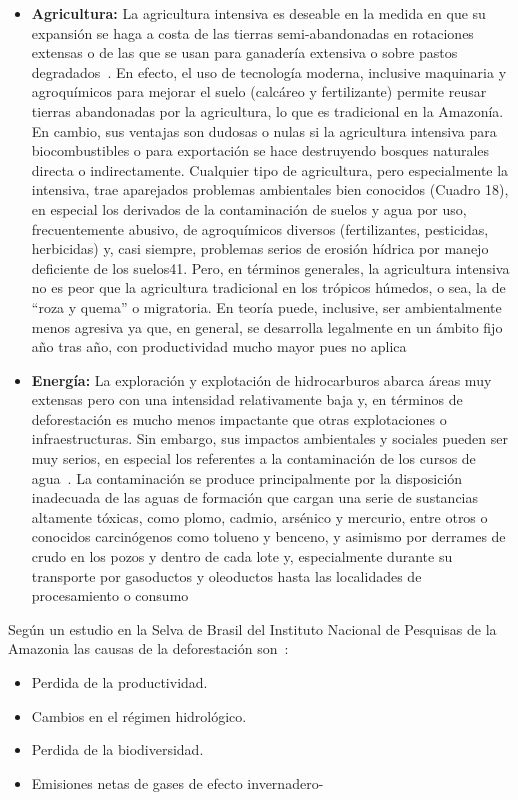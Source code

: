 \begin{itemize}
\item \textbf{Agricultura: }La agricultura intensiva es deseable en la medida en que su expansión se haga a costa de las tierras semi-abandonadas en rotaciones extensas o de las que se usan para ganadería extensiva o sobre pastos degradados~\cite{dourojeanni2009amazonia}. En efecto, el uso de tecnología moderna, inclusive maquinaria y agroquímicos para mejorar el suelo (calcáreo y fertilizante) permite reusar tierras abandonadas por la agricultura, lo que es tradicional en la Amazonía. En cambio, sus ventajas son dudosas o nulas si la agricultura intensiva para biocombustibles o para exportación se hace destruyendo bosques naturales directa o indirectamente. Cualquier tipo de agricultura, pero especialmente la intensiva, trae aparejados problemas ambientales bien conocidos (Cuadro 18), en especial los derivados de la contaminación de suelos y agua por uso, frecuentemente abusivo, de agroquímicos diversos (fertilizantes, pesticidas, herbicidas) y, casi siempre, problemas serios de erosión hídrica por manejo deficiente de los suelos41. Pero, en términos generales, la agricultura intensiva no es peor que la agricultura tradicional en los trópicos húmedos, o sea, la de “roza y quema” o migratoria. En teoría puede, inclusive, ser ambientalmente menos agresiva ya que, en general, se desarrolla legalmente en un ámbito fijo año tras año, con productividad mucho mayor pues no aplica
\item \textbf{Energía: }
La exploración y explotación de hidrocarburos abarca áreas muy extensas pero con una intensidad relativamente baja y, en términos de deforestación es mucho menos impactante que otras explotaciones o infraestructuras. Sin embargo, sus impactos ambientales y sociales pueden ser muy serios, en especial los referentes a la contaminación de los cursos de agua~\cite{dourojeanni2009amazonia}. La contaminación se produce principalmente por la disposición inadecuada de las aguas de formación que cargan una serie de sustancias altamente tóxicas, como plomo, cadmio, arsénico y mercurio, entre otros o conocidos carcinógenos como tolueno y benceno, y asimismo por derrames de crudo en los pozos y dentro de cada lote y, especialmente durante su transporte por gasoductos y oleoductos hasta las localidades de  procesamiento o consumo
  
 \end{itemize}


Según un estudio en la Selva de Brasil del Instituto Nacional de Pesquisas de la Amazonia las causas de la deforestación son~\cite{fearnside2005deforestation}:
\begin{itemize}
\item Perdida de la productividad.
\item Cambios en el régimen hidrológico.
\item Perdida de la biodiversidad.
\item Emisiones netas de gases de efecto invernadero-

\end{itemize}
